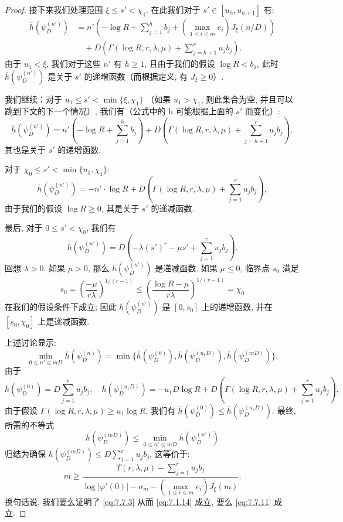 \begin{proof}
接下来我们处理范围 \(\xi \leq s' < \chi_1\). 
在此我们对于 \(s' \in [u_h, u_{h+1}]\) 有:
\[
\begin{aligned}
\overline{h}(\psi_D^{(n')}) 
&= n' \left( -\log R + \sum_{j=1}^h b_j + \left( \max_{1 \le i \le m} e_i \right) J_{\xi}(n/D) \right) \\
&\quad + D \left( \Gamma(\log R, r, \lambda, \mu) + \sum_{j=h+1}^r u_j b_j \right).
\end{aligned}
\]
由于 \(u_1 < \xi\), 我们对于这些 \(n'\) 有 \(h \ge 1\), 
且由于我们的假设 \(\log R < b_1\), 
此时 \(\overline{h}(\psi_D^{(n')})\) 是关于 \(s'\) 的递增函数（而根据定义, 有 \(J_{\xi} \ge 0\)）.

我们继续：对于 \(u_1 \leq s' < \min\{\xi, \chi_1\}\) （如果 \(u_1 > \chi_1\), 
则此集合为空, 并且可以跳到下文的下一个情况）, 我们有（公式中的 h 可能根据上面的 \(s'\) 而变化）:
\[ \overline{h}(\psi_D^{(n')}) = n'(-\log R + \sum_{j=1}^h b_j) + D\left(\Gamma(\log R, r, \lambda, \mu) + \sum_{j=h+1}^r u_j b_j\right), \]
其也是关于 \(s'\) 的递增函数.

对于 \(\chi_0 \le s' < \min\{u_1, \chi_1\}\):
\[ \overline{h}(\psi_D^{(n')}) = -n' \cdot \log R + D\left(\Gamma(\log R, r, \lambda, \mu) + \sum_{j=1}^r u_j b_j\right), \]
由于我们的假设 \(\log R \geq 0\), 其是关于 \(s'\) 的递减函数.

最后, 对于 \(0 \le s' < \chi_0\), 我们有
\[ \overline{h}(\psi_D^{(n')}) = D\left(-\lambda(s')^r - \mu s' + \sum_{j=1}^r u_j b_j\right). \]
回想 \(\lambda > 0\). 如果 \(\mu > 0\), 那么 \(\overline{h}(\psi_D^{(n')})\) 是递减函数. 
如果 \(\mu \leq 0\), 临界点 \(s_0\) 满足
\[ s_0 = \left(\frac{-\mu}{r\lambda}\right)^{1/(r-1)} \le \left(\frac{\log R - \mu}{r\lambda}\right)^{1/(r-1)} = \chi_0 \]
在我们的假设条件下成立; 
因此 \(\overline{h}(\psi_D^{(n')})\) 是 \([0, s_0]\) 上的递增函数, 
并在 \([s_0, \chi_0]\) 上是递减函数.

上述讨论显示:
\[ \min_{0 \le n' \le mD} \overline{h}(\psi_D^{(n)}) = \min\{\overline{h}(\psi_D^{(0)}), \overline{h}(\psi_D^{(u_1D)}), \overline{h}(\psi_D^{(mD)})\}. \]
由于
\[ \overline{h}(\psi_D^{(0)}) = D \sum_{j=1}^r u_j b_j, \quad \overline{h}(\psi_D^{(u_1 D)}) = -u_1 D \log R + D \left( \Gamma(\log R, r, \lambda, \mu) + \sum_{j=1}^r u_j b_j \right), \]
由于假设 \(\Gamma(\log R, r, \lambda, \mu) \geq u_1 \log R\), 我们有 \(\overline{h}(\psi_D^{(0)}) \leq \overline{h}(\psi_D^{(u_1D)})\). 
最终, 所需的不等式
\[ \overline{h}(\psi_D^{(mD)}) \le \min_{0 \le n' \le mD} \overline{h}(\psi_D^{(n')}) \]
归结为确保 \(h(\psi_D^{(mD)}) \le D \sum_{j=1}^r u_j b_j\), 这等价于:
\[ m \ge \frac{T(r, \lambda, \mu) - \sum_{j=1}^{r} u_j b_j}{\log |\varphi'(0)| - \sigma_m - (\max_{1 \le i \le m} e_i) J_{\xi}(m)}. \]
换句话说, 我们要么证明了 \eqref{eq:7.7.3} 从而 \eqref{eq:7.1.14} 成立, 
要么 \eqref{eq:7.7.11} 成立.
\end{proof}